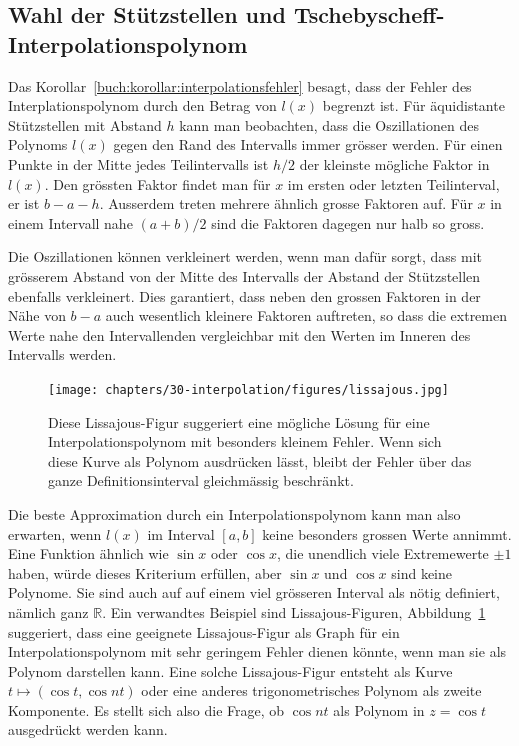 %
%
\subsection{Wahl der Stützstellen und Tschebyscheff-Interpolationspolynom
\label{buch:section:interpolation:tschebyscheff}}
Das Korollar~\ref{buch:korollar:interpolationsfehler} besagt, dass der
Fehler des Interplationspolynom durch den Betrag von $l(x)$ begrenzt
ist.
Für äquidistante Stützstellen mit Abstand $h$ kann man beobachten,
dass die Oszillationen des Polynoms $l(x)$ gegen den Rand des Intervalls
immer grösser werden.
Für einen Punkte in der Mitte jedes Teilintervalls ist $h/2$ der kleinste
mögliche Faktor in $l(x)$. 
Den grössten Faktor findet man für $x$ im ersten oder letzten Teilinterval,
er ist $b-a-h$.
Ausserdem treten mehrere ähnlich grosse Faktoren auf.
Für $x$ in einem Intervall nahe $(a+b)/2$ sind die Faktoren
dagegen nur halb so gross.

Die Oszillationen können verkleinert werden, wenn man dafür sorgt, dass
mit grösserem Abstand von der Mitte des Intervalls der Abstand der
Stützstellen ebenfalls verkleinert.
Dies garantiert, dass neben den grossen Faktoren in der Nähe von $b-a$ 
auch wesentlich kleinere Faktoren auftreten, so dass die extremen Werte
nahe den Intervallenden vergleichbar mit den Werten im Inneren des
Intervalls werden.

\begin{figure}
\centering
\texttt{[image: chapters/30-interpolation/figures/lissajous.jpg]}
\caption{Diese Lissajous-Figur suggeriert eine mögliche Lösung für eine 
Interpolationspolynom mit besonders kleinem Fehler.
Wenn sich diese Kurve als Polynom ausdrücken lässt, bleibt der Fehler über
das ganze Definitionsinterval gleichmässig beschränkt.
\label{buch:figure:lissajous}}
\end{figure}

Die beste Approximation durch ein Interpolationspolynom kann man also
erwarten, wenn $l(x)$ im Interval $[a,b]$ keine besonders grossen Werte
annimmt.
Eine Funktion ähnlich wie $\sin x$ oder $\cos x$, die unendlich viele
Extremewerte $\pm 1$ haben, würde dieses Kriterium erfüllen, aber
$\sin x$ und $\cos x$ sind keine Polynome.
Sie sind auch auf auf einem viel grösseren Interval als nötig definiert,
nämlich ganz $\mathbb R$.
Ein verwandtes Beispiel sind Lissajous-Figuren,
Abbildung~\ref{buch:figure:lissajous} suggeriert, dass eine geeignete
Lissajous-Figur als Graph für ein Interpolationspolynom mit sehr
geringem Fehler dienen könnte, wenn man sie als Polynom darstellen kann.
Eine solche Lissajous-Figur entsteht als Kurve
$t\mapsto (\cos t, \cos nt)$ oder eine anderes trigonometrisches
Polynom als zweite Komponente.
Es stellt sich also die Frage, ob $\cos nt$ als Polynom in $z=\cos t$
ausgedrückt werden kann.

